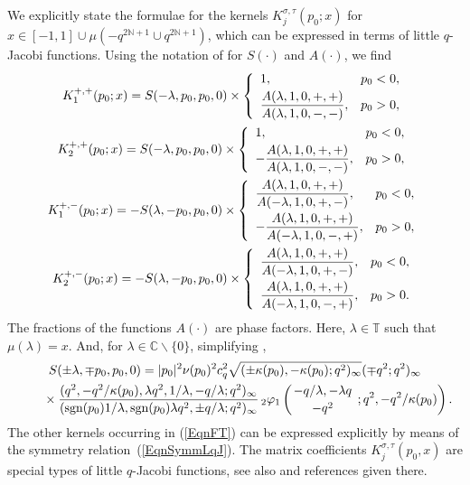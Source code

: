 \documentclass[pdftex]{sigma}
\numberwithin{equation}{section}
\theoremstyle{definition}
\newcommand{\sgn}{\text{\rm sgn}}
\newcommand{\rFs}[5]{\,_{#1}\varphi_{#2} \left( \genfrac{.}{.}{0pt}{}{#3}{#4}
\ ;#5 \right)}
\begin{document}
We explicitly state the formulae for the kernels $K_j^{\sigma, \tau}(p_0;x)$ for $x \in [-1,1] \cup \mu(-q^{2\mathbb{N}+1} \cup q^{2\mathbb{N}+1})$, which can be expressed in terms of little $q$-Jacobi functions.  Using the notation of \cite[Section~9]{GroKoeKus} for $S(\cdot)$ and $A(\cdot)$, we f\/ind
\begin{gather*}
K_1^{+, +}(p_0; x)  = S(-\lambda, p_0, p_0, 0) \times \left\{
\begin{array}{ll}
1, & p_0 < 0, \vspace{1mm}\\
\dfrac{A(\lambda, 1, 0, +, +)}{A(\lambda, 1, 0, -, -)}, & p_0 > 0,
\end{array}
\right. \\
K_2^{+, +}(p_0; x)   = S(-\lambda, p_0, p_0, 0) \times \left\{
\begin{array}{ll}
1, & p_0 < 0, \vspace{1mm}\\
-\dfrac{A(\lambda, 1, 0, +, +)}{A(\lambda, 1, 0, -, -)} ,& p_0 > 0,
\end{array}
\right. \\
K_1^{+, -}(p_0; x)   = -S(\lambda, -p_0, p_0, 0) \times \left\{
\begin{array}{ll}
\dfrac{A(\lambda, 1, 0, +, +)}{A(-\lambda, 1, 0, +, -)}, & p_0 < 0, \vspace{1mm}\\
-\dfrac{A(\lambda, 1, 0, +, +)}{A(-\lambda, 1, 0, -, +)}, & p_0 > 0,
\end{array}
\right. \\
K_2^{+, -}(p_0; x)    = -S(\lambda, -p_0, p_0, 0) \times \left\{
\begin{array}{ll}
\dfrac{A(\lambda, 1, 0, +, +)}{A(-\lambda, 1, 0, +, -)}, & p_0 < 0, \vspace{1mm}\\
\dfrac{A(\lambda, 1, 0, +, +)}{A(-\lambda, 1, 0, -, +)}, & p_0 > 0.
\end{array}
\right. \\
\end{gather*}
The fractions of the functions $A(\cdot)$ are phase factors.
Here, $\lambda \in \mathbb{T}$ such that $\mu(\lambda) = x$. And, for $\lambda \in \mathbb{C} \backslash \{0\}$, simplifying \cite[Lemma~9.1~(ii)]{GroKoeKus},
\begin{gather*}
S(\pm \lambda, \mp p_0, p_0, 0) =   \vert p_0 \vert^2 \nu(p_0)^2 c_q^2 \sqrt{(\pm \kappa(p_0), - \kappa(p_0); q^2)_\infty } (\mp q^2; q^2)_\infty    \\
\qquad{} \times\frac{(q^2, -q^2/\kappa(p_0), \lambda q^2, 1/\lambda, -q/\lambda ; q^2)_\infty}{(\sgn(p_0) 1/\lambda, \sgn(p_0) \lambda q^2, \pm q/\lambda; q^2)_\infty } \rFs{2}{1}{-q/\lambda, -\lambda q}{-q^2}{q^2, -q^2/\kappa(p_0)}.
\end{gather*}
The other kernels occurring in (\ref{EqnFT}) can be expressed explicitly by means of the symmetry relation~(\ref{EqnSymmLqJ}). The matrix coef\/f\/icients $K^{\sigma, \tau}_j(p_0, x)$ are special types of little $q$-Jacobi functions, see also \cite[Appendix B.5]{GroKoeKus} and references given there.
\end{document}
